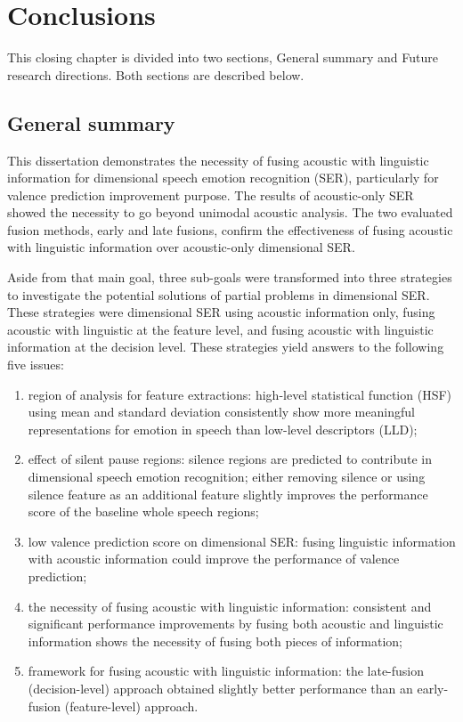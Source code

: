 \chapter{Conclusions}
This closing chapter is divided into two sections, General summary and Future
research directions. Both sections are described below.

\section{General summary}
This dissertation demonstrates the necessity of fusing acoustic with linguistic
information for dimensional speech emotion recognition (SER), particularly for
valence prediction improvement purpose. The results of acoustic-only SER showed
the necessity to go beyond unimodal acoustic analysis. The two evaluated
fusion methods, early and late fusions, confirm the effectiveness of fusing
acoustic with linguistic information over acoustic-only dimensional SER.

Aside from that main goal, three sub-goals were transformed into three
strategies to investigate the potential solutions of partial
problems in dimensional SER. These strategies were dimensional SER using
acoustic information only, fusing acoustic with linguistic at the feature level,
and fusing acoustic with linguistic information at the decision level. These
strategies yield answers to the following five issues:
\begin{enumerate}
\item region of analysis for feature extractions: high-level statistical
function (HSF) using mean and standard deviation consistently show more
meaningful representations for emotion in speech than low-level descriptors
(LLD);
\item effect of silent pause regions: silence regions are predicted to
contribute in dimensional speech emotion recognition; either removing silence or
using silence feature as an additional feature slightly improves the
performance score of the baseline whole speech regions;
\item low valence prediction score on dimensional SER: fusing linguistic
information with  acoustic information could improve the performance of valence
prediction;
\item the necessity of fusing acoustic with linguistic information: consistent
and significant performance improvements by fusing both acoustic and linguistic
information shows the necessity of fusing both pieces of information;
\item framework for fusing acoustic with linguistic information: the late-fusion
(decision-level) approach  obtained slightly better performance than an
early-fusion (feature-level) approach. 
\end{enumerate}


